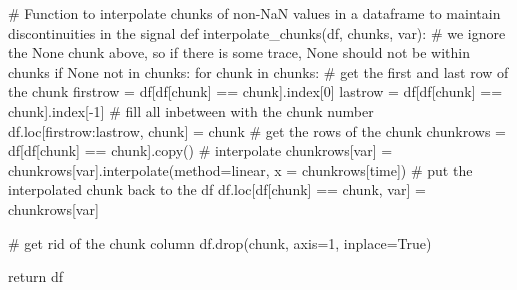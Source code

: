 \documentclass[
  letterpaper,
  DIV=11,
  numbers=noendperiod]{scrreprt}
\newenvironment{Shaded}{\begin{snugshade}}{\end{snugshade}}
\newcommand{\CommentTok}[1]{\textcolor[rgb]{0.37,0.37,0.37}{#1}}
\newcommand{\ControlFlowTok}[1]{\textcolor[rgb]{0.00,0.23,0.31}{#1}}
\newcommand{\DecValTok}[1]{\textcolor[rgb]{0.68,0.00,0.00}{#1}}
\newcommand{\KeywordTok}[1]{\textcolor[rgb]{0.00,0.23,0.31}{#1}}
\newcommand{\NormalTok}[1]{\textcolor[rgb]{0.00,0.23,0.31}{#1}}
\newcommand{\OperatorTok}[1]{\textcolor[rgb]{0.37,0.37,0.37}{#1}}
\newcommand{\StringTok}[1]{\textcolor[rgb]{0.13,0.47,0.30}{#1}}
\newcommand{\VariableTok}[1]{\textcolor[rgb]{0.07,0.07,0.07}{#1}}
\begin{document}
\begin{Shaded}
\begin{Highlighting}[]
\CommentTok{\# Function to interpolate chunks of non{-}NaN values in a dataframe to maintain discontinuities in the signal}
\KeywordTok{def}\NormalTok{ interpolate\_chunks(df, chunks, var):}
    \CommentTok{\# we ignore the None chunk above, so if there is some trace, None should not be within chunks}
    \ControlFlowTok{if} \VariableTok{None} \KeywordTok{not} \KeywordTok{in}\NormalTok{ chunks:}
        \ControlFlowTok{for}\NormalTok{ chunk }\KeywordTok{in}\NormalTok{ chunks:}
            \CommentTok{\# get the first and last row of the chunk}
\NormalTok{            firstrow }\OperatorTok{=}\NormalTok{ df[df[}\StringTok{\textquotesingle{}chunk\textquotesingle{}}\NormalTok{] }\OperatorTok{==}\NormalTok{ chunk].index[}\DecValTok{0}\NormalTok{]}
\NormalTok{            lastrow }\OperatorTok{=}\NormalTok{ df[df[}\StringTok{\textquotesingle{}chunk\textquotesingle{}}\NormalTok{] }\OperatorTok{==}\NormalTok{ chunk].index[}\OperatorTok{{-}}\DecValTok{1}\NormalTok{]}
            \CommentTok{\# fill all inbetween with the chunk number}
\NormalTok{            df.loc[firstrow:lastrow, }\StringTok{\textquotesingle{}chunk\textquotesingle{}}\NormalTok{] }\OperatorTok{=}\NormalTok{ chunk}
            \CommentTok{\# get the rows of the chunk}
\NormalTok{            chunkrows }\OperatorTok{=}\NormalTok{ df[df[}\StringTok{\textquotesingle{}chunk\textquotesingle{}}\NormalTok{] }\OperatorTok{==}\NormalTok{ chunk].copy()}
            \CommentTok{\# interpolate}
\NormalTok{            chunkrows[var] }\OperatorTok{=}\NormalTok{ chunkrows[var].interpolate(method}\OperatorTok{=}\StringTok{\textquotesingle{}linear\textquotesingle{}}\NormalTok{, x }\OperatorTok{=}\NormalTok{ chunkrows[}\StringTok{\textquotesingle{}time\textquotesingle{}}\NormalTok{])}
            \CommentTok{\# put the interpolated chunk back to the df}
\NormalTok{            df.loc[df[}\StringTok{\textquotesingle{}chunk\textquotesingle{}}\NormalTok{] }\OperatorTok{==}\NormalTok{ chunk, var] }\OperatorTok{=}\NormalTok{ chunkrows[var]}

    \CommentTok{\# get rid of the chunk column}
\NormalTok{    df.drop(}\StringTok{\textquotesingle{}chunk\textquotesingle{}}\NormalTok{, axis}\OperatorTok{=}\DecValTok{1}\NormalTok{, inplace}\OperatorTok{=}\VariableTok{True}\NormalTok{)}

    \ControlFlowTok{return}\NormalTok{ df}
\end{Highlighting}
\end{Shaded}
\end{document}
